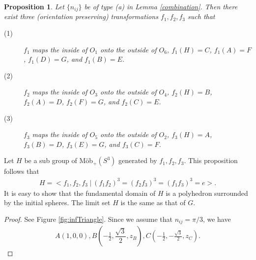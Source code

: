 \documentclass[suppldata, dvipdfmx]{interact}
\theoremstyle{plain}%
\newtheorem{proposition}[theorem]{Proposition}
\theoremstyle{definition}
\theoremstyle{remark}
\theoremstyle{problemstyle}
\begin{document}
\begin{proposition}
Let $\{n_{ij}\}$ be of type (a) in Lemma \ref{combination}. Then there exist three
 (orientation preserving) transformations $f_1, f_2, f_3$ such that
 \begin{description}
  \item[(1)] $f_1$ maps the inside of $O_1$ onto the outside of
             $O_6$, $f_1(H) = C$, $f_1(A) = F$,  $f_1(D) = G$, and
             $f_1(B) = E$.
  \item[(2)] $f_2$ maps the inside of $O_3$ onto the outside of
             $O_4$, $f_2(H) = B$, $f_2(A) = D$,  $f_2(F) = G$, and
             $f_2(C) = E$.             
  \item[(3)] $f_3$ maps the inside of $O_5$ onto the outside of
             $O_2$, $f_3(H) = A$, $f_3(B) = D$,  $f_3(E) = G$, and
             $f_3(C) = F$.
\end{description}
\end{proposition}

Let $H$ be a sub group of M\"ob$_+(S^3)$ generated by $f_1, f_2,
f_3$. This proposition follows that
\begin{align*}
 H = <f_1, f_2, f_3~|~(f_1f_2)^3 = (f_2f_3)^3 = (f_1f_3)^3 = e>.
\end{align*}
It is easy to show that the fundamental domain of $H$ is a polyhedron
surrounded by the initial spheres. The limit set $H$ is the same as that
of $G$.

\begin{proof}
See Figure \ref{fig:infTriangle}. Since we assume that $n_{ij} = \pi/3$, we have
\begin{align*}
 A(1, 0, 0), B(-\frac{1}{2}, \dfrac{\sqrt{3}}{2}, z_B), C(-\frac{1}{2}, -\frac{\sqrt{3}}{2}, z_C).
\end{align*}
\end{proof}
\end{document}
